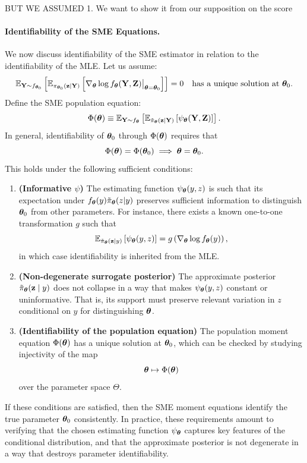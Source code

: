 \documentclass[twoside,11pt]{article}
\begin{document}
{BUT WE ASSUMED 1. We want to show it from our supposition on the score

\paragraph{Identifiability of the SME Equations.}
We now discuss identifiability of the SME estimator in relation to the identifiability of the MLE. Let us assume:
%
\begin{equation}
\mathbb{E}_{{\bf Y} \sim f_{{\bm{\theta}}_0}} \left[
\mathbb{E}_{\pi_{{\bm{\theta}}_0}({\bf z} \mid {\bf Y})}
\left[
\nabla_{\bm{\theta}} \log f_{{\bm{\theta}}}({\bf Y}, {\bf Z}) \big|_{{\bm{\theta}}={\bm{\theta}}_0}
\right]
\right]
= 0
\quad \text{has a unique solution at } {\bm{\theta}}_0.
\end{equation}
%
Define the SME population equation:
%
\begin{equation}
\label{eqn:population-sme-identifiability}
\Phi({\bm{\theta}})
\equiv
\mathbb{E}_{{\bf Y} \sim f_{{\bm{\theta}}}} \left[
\mathbb{E}_{\tilde\pi_{\bm{\theta}}({\bf z} \mid {\bf Y})}
\left[
\psi_{\bm{\theta}}({\bf Y}, {\bf Z})
\right]
\right].
\end{equation}
%
In general, identifiability of ${\bm{\theta}}_0$ through $\Phi({\bm{\theta}})$ requires that
%
\[
\Phi({\bm{\theta}}) = \Phi({\bm{\theta}}_0)
\implies
{\bm{\theta}} = {\bm{\theta}}_0.
\]
%
This holds under the following sufficient conditions:
\begin{enumerate}
    \item \textbf{(Informative $\psi$)} The estimating function $\psi_{\bm{\theta}}(y,z)$ is such that its expectation under $f_{\bm{\theta}}(y)\tilde\pi_{\bm{\theta}}(z|y)$ preserves sufficient information to distinguish ${\bm{\theta}}_0$ from other parameters. For instance, there exists a known one-to-one transformation $g$ such that
    \[
    \mathbb{E}_{\tilde\pi_{\bm{\theta}}({\bf z} \mid y)}\left[\psi_{\bm{\theta}}(y,z)\right]
    = g\left( \nabla_{\bm{\theta}} \log f_{\bm{\theta}}(y) \right),
    \]
    in which case identifiability is inherited from the MLE.
    \item \textbf{(Non-degenerate surrogate posterior)} The approximate posterior $\tilde\pi_{\bm{\theta}}({\bf z} \mid y)$ does not collapse in a way that makes $\psi_{\bm{\theta}}(y,z)$ constant or uninformative. That is, its support must preserve relevant variation in $z$ conditional on $y$ for distinguishing ${\bm{\theta}}$.
    \item \textbf{(Identifiability of the population equation)} The population moment equation $\Phi({\bm{\theta}})$ has a unique solution at ${\bm{\theta}}_0$, which can be checked by studying injectivity of the map
    \[
    {\bm{\theta}} \mapsto \Phi({\bm{\theta}})
    \]
    over the parameter space $\Theta$.
\end{enumerate}
%
If these conditions are satisfied, then the SME moment equations identify the true parameter ${\bm{\theta}}_0$ consistently. In practice, these requirements amount to verifying that the chosen estimating function $\psi_{\bm{\theta}}$ captures key features of the conditional distribution, and that the approximate posterior is not degenerate in a way that destroys parameter identifiability.



}
\end{document}
